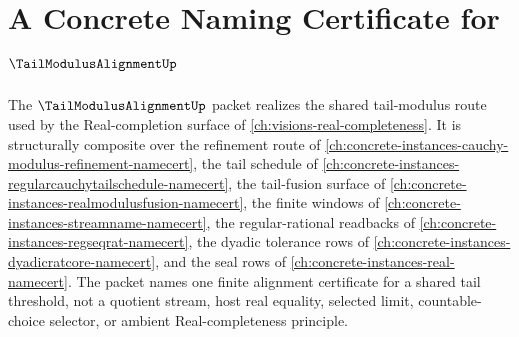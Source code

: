 \chapter{A Concrete Naming Certificate for $\TailModulusAlignmentUp$}
\label{ch:concrete-instances-tail-modulus-alignment-namecert}

The $\TailModulusAlignmentUp$ packet realizes the shared tail-modulus route used by the Real-completion surface of \autoref{ch:visions-real-completeness}. It is structurally composite over the refinement route of \autoref{ch:concrete-instances-cauchy-modulus-refinement-namecert}, the tail schedule of \autoref{ch:concrete-instances-regularcauchytailschedule-namecert}, the tail-fusion surface of \autoref{ch:concrete-instances-realmodulusfusion-namecert}, the finite windows of \autoref{ch:concrete-instances-streamname-namecert}, the regular-rational readbacks of \autoref{ch:concrete-instances-regseqrat-namecert}, the dyadic tolerance rows of \autoref{ch:concrete-instances-dyadicratcore-namecert}, and the seal rows of \autoref{ch:concrete-instances-real-namecert}. The packet names one finite alignment certificate for a shared tail threshold, not a quotient stream, host real equality, selected limit, countable-choice selector, or ambient Real-completeness principle.

